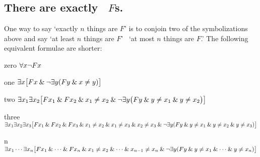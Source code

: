 \subsection*{There are exactly \blank\ $F$s.}
\label{summary.exactly}

One way to say `exactly $n$ things are $F$' is to conjoin two of the symbolizations above and say `at least $n$ things are $F$' \eand\ `at most $n$ things are $F$.' The following equivalent formulae are shorter:
\begin{ekey}
\item[zero] $\forall x{\neg} Fx$
\item[one] $\exists x\bigl[Fx \mathbin{\&} {\neg}\exists y(Fy \mathbin{\&} x\neq y)\bigr]$
\item[two] $\exists x_1\exists x_2\bigl[Fx_1 \mathbin{\&} Fx_2 \mathbin{\&} x_1 \neq x_2 \mathbin{\&} {\neg}\exists y\bigl(Fy \mathbin{\&} y\neq x_1 \mathbin{\&} y \neq x_2\bigr) \bigr]$
\item[three] $\exists x_1\exists x_2\exists x_3\bigl[Fx_1 \mathbin{\&} Fx_2 \mathbin{\&} Fx_3 \mathbin{\&} x_1 \neq x_2 \mathbin{\&} x_1 \neq x_3 \mathbin{\&} x_2 \neq x_3 \mathbin{\&}\\
{\neg}\exists y(Fy \mathbin{\&} y \neq x_1 \mathbin{\&} y \neq x_2 \mathbin{\&} y\neq x_3) \bigr]$
\item[n] $\exists x_1\cdots\exists x_n\bigl[Fx_1 \mathbin{\&}\cdots\mathbin{\&} Fx_n  \mathbin{\&} x_1 \neq x_2 \mathbin{\&}\cdots\mathbin{\&} x_{n-1}\neq x_n \mathbin{\&}\\
 {\neg}\exists y(Fy \mathbin{\&} y\neq x_1 \mathbin{\&} \cdots \mathbin{\&} y\neq x_n)\bigr]$ 
\end{ekey}






